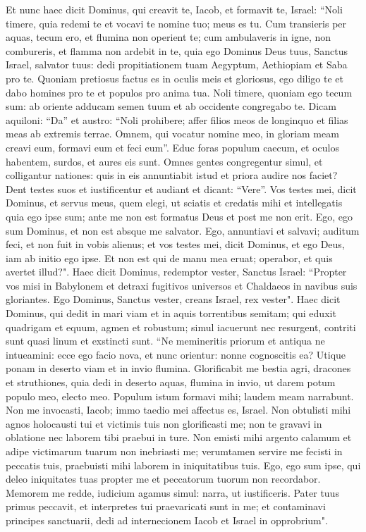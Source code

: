 \begin{biblechapter}  
\verse Et nunc haec dicit Dominus, qui creavit te, Iacob, et formavit te, Israel: “Noli timere, quia redemi te et vocavi te nomine tuo; meus es tu. 
\verse Cum transieris per aquas, tecum ero, et flumina non operient te; cum ambulaveris in igne, non combureris, et flamma non ardebit in te, 
\verse quia ego Dominus Deus tuus, Sanctus Israel, salvator tuus: dedi propitiationem tuam Aegyptum, Aethiopiam et Saba pro te. 
\verse Quoniam pretiosus factus es in oculis meis et gloriosus, ego diligo te et dabo homines pro te et populos pro anima tua. 
\verse Noli timere, quoniam ego tecum sum: ab oriente adducam semen tuum et ab occidente congregabo te. 
\verse Dicam aquiloni: “Da” et austro: “Noli prohibere; affer filios meos de longinquo et filias meas ab extremis terrae. 
\verse Omnem, qui vocatur nomine meo, in gloriam meam creavi eum, formavi eum et feci eum”. 
\verse Educ foras populum caecum, et oculos habentem, surdos, et aures eis sunt. 
\verse Omnes gentes congregentur simul, et colligantur nationes: quis in eis annuntiabit istud et priora audire nos faciet? Dent testes suos et iustificentur et audiant et dicant: “Vere”. 
\verse Vos testes mei, dicit Dominus, et servus meus, quem elegi, ut sciatis et credatis mihi et intellegatis quia ego ipse sum; ante me non est formatus Deus et post me non erit. 
\verse Ego, ego sum Dominus, et non est absque me salvator. 
\verse Ego, annuntiavi et salvavi; auditum feci, et non fuit in vobis alienus; et vos testes mei, dicit Dominus, et ego Deus, 
\verse iam ab initio ego ipse. Et non est qui de manu mea eruat; operabor, et quis avertet illud?". 
\verse Haec dicit Dominus, redemptor vester, Sanctus Israel: “Propter vos misi in Babylonem et detraxi fugitivos universos et Chaldaeos in navibus suis gloriantes. 
\verse Ego Dominus, Sanctus vester, creans Israel, rex vester". 
\verse Haec dicit Dominus, qui dedit in mari viam et in aquis torrentibus semitam; 
\verse qui eduxit quadrigam et equum, agmen et robustum; simul iacuerunt nec resurgent, contriti sunt quasi linum et exstincti sunt. 
\verse “Ne memineritis priorum et antiqua ne intueamini: 
\verse ecce ego facio nova, et nunc orientur: nonne cognoscitis ea? Utique ponam in deserto viam et in invio flumina. 
\verse Glorificabit me bestia agri, dracones et struthiones, quia dedi in deserto aquas, flumina in invio, ut darem potum populo meo, electo meo. 
\verse Populum istum formavi mihi; laudem meam narrabunt. 
\verse Non me invocasti, Iacob; immo taedio mei affectus es, Israel. 
\verse Non obtulisti mihi agnos holocausti tui et victimis tuis non glorificasti me; non te gravavi in oblatione nec laborem tibi praebui in ture. 
\verse Non emisti mihi argento calamum et adipe victimarum tuarum non inebriasti me; verumtamen servire me fecisti in peccatis tuis, praebuisti mihi laborem in iniquitatibus tuis. 
\verse Ego, ego sum ipse, qui deleo iniquitates tuas propter me et peccatorum tuorum non recordabor. 
\verse Memorem me redde, iudicium agamus simul: narra, ut iustificeris. 
\verse Pater tuus primus peccavit, et interpretes tui praevaricati sunt in me; 
\verse et contaminavi principes sanctuarii, dedi ad internecionem Iacob et Israel in opprobrium". 
\end{biblechapter}

